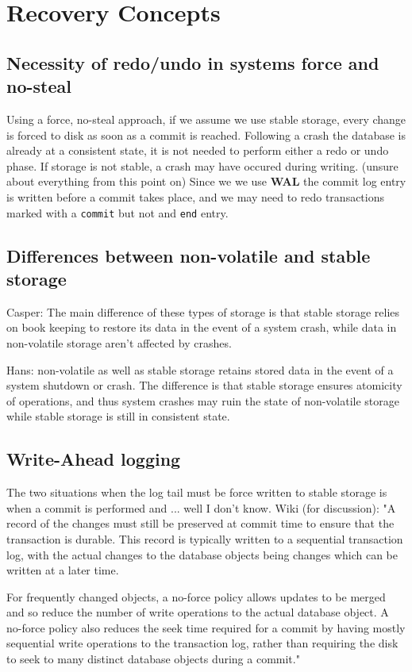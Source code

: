
\section{Recovery Concepts}

\subsection{Necessity of redo/undo in systems force and no-steal}
Using a force, no-steal approach, if we assume we use stable storage,
every change is forced to disk as soon as a commit is reached. Following a
crash the database is already at a consistent state, it is not needed to
perform either a redo or undo phase. If storage is not stable, a crash may
have occured during writing. (unsure about everything from this point on)
Since we we use {\bf WAL} the commit log entry is written before a commit
takes place, and we may need to redo transactions marked with a {\tt commit} but not
and {\tt end} entry.

\subsection{Differences between non-volatile and stable storage}
Casper:
The main difference of these types of storage is that stable storage relies on
book keeping to restore its data in the event of a system crash, while data in
non-volatile storage aren't affected by crashes.

Hans:
non-volatile as well as stable storage retains stored data in the event of a
system shutdown or crash. The difference is that stable storage ensures
atomicity of operations, and thus system crashes may ruin the state of
non-volatile storage while stable storage is still in consistent state.

\subsection{Write-Ahead logging}

The two situations when the log tail must be force written to stable storage
is when a commit is performed and ... well I don't know.
Wiki (for discussion): "A record of the changes must still be preserved at commit time to ensure that the transaction is durable. This record is typically written to a sequential transaction log, with the actual changes to the database objects being changes which can be written at a later time.

For frequently changed objects, a no-force policy allows updates to be merged and so reduce the number of write operations to the actual database object. A no-force policy also reduces the seek time required for a commit by having mostly sequential write operations to the transaction log, rather than requiring the disk to seek to many distinct database objects during a commit."